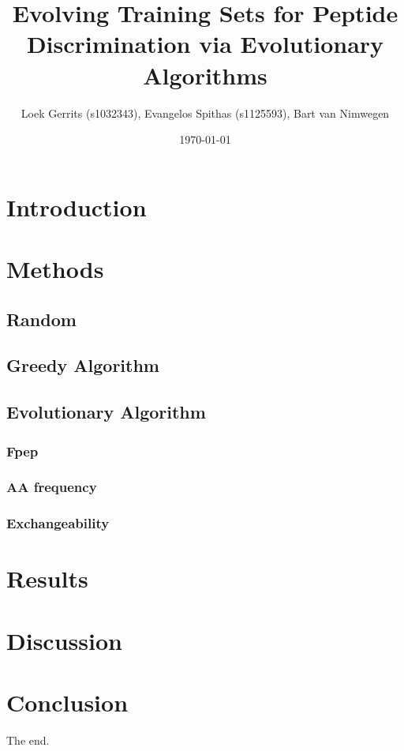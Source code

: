 \documentclass{article}
\title{Evolving Training Sets for Peptide Discrimination via Evolutionary Algorithms}
\author{Loek Gerrits (s1032343), Evangelos Spithas (s1125593), Bart van Nimwegen}
\date{\today}
\begin{document}
 

\maketitle

\section{Introduction}



\section{Methods}

\subsection{Random}


\subsection{Greedy Algorithm}


\subsection{Evolutionary Algorithm}

\subsubsection{Fpep}

\subsubsection{AA frequency}

\subsubsection{Exchangeability}



\section{Results}



\section{Discussion}



\section{Conclusion}

The end.

\printbibliography

\appendix
\end{document}
